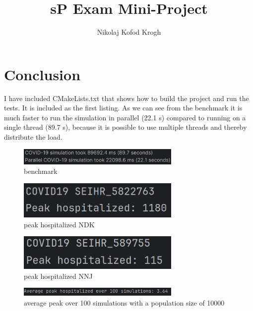 \documentclass[a4paper]{article}
\title{sP Exam Mini-Project}
\author{Nikolaj Kofod Krogh}
\begin{document}
\newpage
{}
\maketitle

\section*{Conclusion}
I have included CMakeLists.txt that shows how to build the project and run the tests. It is included as the first listing.
\newline
\newline
As we can see from the benchmark it is much faster to run the simulation in parallel (22.1 s) compared to running on a single thread (89.7 s), because it is possible to use multiple threads and thereby distribute the load.

\begin{figure}[H]
  \centering
  \includegraphics[width=0.7\textwidth]{images/benchmark.png}
  \caption{benchmark}
\end{figure}

\begin{figure}[H]
  \centering
  \includegraphics[width=0.7\textwidth]{images/peak_hospitalized_ndk.png}
  \caption{peak hospitalized NDK}
\end{figure}

\begin{figure}[H]
  \centering
  \includegraphics[width=0.7\textwidth]{images/peak_hospitalized_nnj.png}
  \caption{peak hospitalized NNJ}
\end{figure}

\begin{figure}[H]
  \centering
  \includegraphics[width=0.7\textwidth]{images/average_peak_over_100_simulations.png}
  \caption{average peak over 100 simulations with a population size of 10000}
\end{figure}
\end{document}
